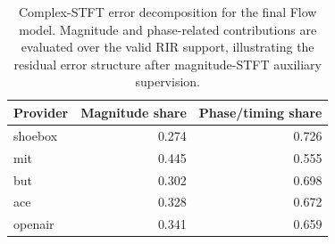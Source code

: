 \begin{table}[t]
\centering\small
\caption{Complex-STFT error decomposition for the final Flow model.
Magnitude and phase-related contributions are evaluated over the valid RIR
support, illustrating the residual error structure after magnitude-STFT
auxiliary supervision.}
\label{tab:phase}
\begin{tabular}{lrr}
\toprule
Provider & Magnitude share & Phase/timing share \\
\midrule
shoebox & 0.274 & 0.726 \\
mit & 0.445 & 0.555 \\
but & 0.302 & 0.698 \\
ace & 0.328 & 0.672 \\
openair & 0.341 & 0.659 \\
\bottomrule
\end{tabular}
\end{table}

